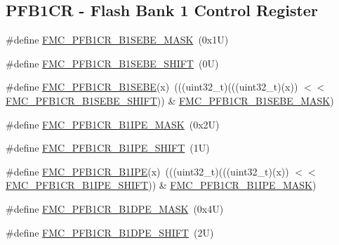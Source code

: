\subsection*{P\+F\+B1\+CR -\/ Flash Bank 1 Control Register}
\begin{DoxyCompactItemize}
\item 
\#define \mbox{\hyperlink{group___f_m_c___register___masks_ga420c5676807fc85197707ac092c58221}{F\+M\+C\+\_\+\+P\+F\+B1\+C\+R\+\_\+\+B1\+S\+E\+B\+E\+\_\+\+M\+A\+SK}}~(0x1\+U)
\item 
\#define \mbox{\hyperlink{group___f_m_c___register___masks_ga8666915cae16d07904756da796935f3c}{F\+M\+C\+\_\+\+P\+F\+B1\+C\+R\+\_\+\+B1\+S\+E\+B\+E\+\_\+\+S\+H\+I\+FT}}~(0\+U)
\item 
\#define \mbox{\hyperlink{group___f_m_c___register___masks_ga55025cfccb1b909fc00617c407df7b60}{F\+M\+C\+\_\+\+P\+F\+B1\+C\+R\+\_\+\+B1\+S\+E\+BE}}(x)~(((uint32\+\_\+t)(((uint32\+\_\+t)(x)) $<$$<$ \mbox{\hyperlink{group___f_m_c___register___masks_ga8666915cae16d07904756da796935f3c}{F\+M\+C\+\_\+\+P\+F\+B1\+C\+R\+\_\+\+B1\+S\+E\+B\+E\+\_\+\+S\+H\+I\+FT}})) \& \mbox{\hyperlink{group___f_m_c___register___masks_ga420c5676807fc85197707ac092c58221}{F\+M\+C\+\_\+\+P\+F\+B1\+C\+R\+\_\+\+B1\+S\+E\+B\+E\+\_\+\+M\+A\+SK}})
\item 
\#define \mbox{\hyperlink{group___f_m_c___register___masks_ga282ed00b64bb32336610c04d1404e86d}{F\+M\+C\+\_\+\+P\+F\+B1\+C\+R\+\_\+\+B1\+I\+P\+E\+\_\+\+M\+A\+SK}}~(0x2\+U)
\item 
\#define \mbox{\hyperlink{group___f_m_c___register___masks_ga6685876e76f4ea584622a68f6bea6b56}{F\+M\+C\+\_\+\+P\+F\+B1\+C\+R\+\_\+\+B1\+I\+P\+E\+\_\+\+S\+H\+I\+FT}}~(1\+U)
\item 
\#define \mbox{\hyperlink{group___f_m_c___register___masks_ga53af3def25653a71796468a4910dfd09}{F\+M\+C\+\_\+\+P\+F\+B1\+C\+R\+\_\+\+B1\+I\+PE}}(x)~(((uint32\+\_\+t)(((uint32\+\_\+t)(x)) $<$$<$ \mbox{\hyperlink{group___f_m_c___register___masks_ga6685876e76f4ea584622a68f6bea6b56}{F\+M\+C\+\_\+\+P\+F\+B1\+C\+R\+\_\+\+B1\+I\+P\+E\+\_\+\+S\+H\+I\+FT}})) \& \mbox{\hyperlink{group___f_m_c___register___masks_ga282ed00b64bb32336610c04d1404e86d}{F\+M\+C\+\_\+\+P\+F\+B1\+C\+R\+\_\+\+B1\+I\+P\+E\+\_\+\+M\+A\+SK}})
\item 
\#define \mbox{\hyperlink{group___f_m_c___register___masks_gad8ceabcc8b8c9f94ac2216c3bf87f3af}{F\+M\+C\+\_\+\+P\+F\+B1\+C\+R\+\_\+\+B1\+D\+P\+E\+\_\+\+M\+A\+SK}}~(0x4\+U)
\item 
\#define \mbox{\hyperlink{group___f_m_c___register___masks_ga9a6d2f7bfce24b100a34731744602db7}{F\+M\+C\+\_\+\+P\+F\+B1\+C\+R\+\_\+\+B1\+D\+P\+E\+\_\+\+S\+H\+I\+FT}}~(2\+U)

\end{DoxyCompactItemize}
